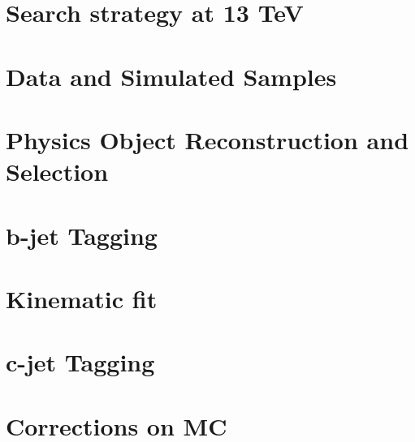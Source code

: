 \newpage
\section{Search strategy at 13 TeV}
\label{s:searchStrategy}


\newpage
\section{Data and Simulated Samples}
\label{s:secDataMC}


\newpage
\section{Physics Object Reconstruction and Selection}
\label{s:secReco}


\section{b-jet Tagging}
\label{s:bTag}


\section{Kinematic fit}
\label{s:KinFit}


\section{c-jet Tagging}
\label{s:cTag}


\newpage
\section{Corrections on MC}
\label{s:secMCSF}


